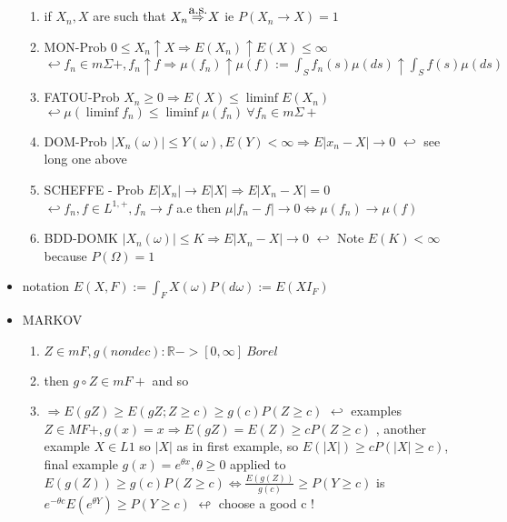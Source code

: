 \documentclass[10pt,landscape,a4paper]{article}
\newcommand\myright[1]{\stackrel{\mathclap{\normalfont\mbox{#1}}}{ \Rightarrow }}
\begin{document}
\begin{multicols*}{3}
\begin{spacing}{0.5}
\begin{itemize}
\begin{enumerate}
\item if $X_n,X$ are such that $X_n \myright{a.s.} X$ ie $P(X_n \rightarrow X)=1$

\item \colorbox{green!10}{MON-Prob $ \boxed{ 0 \le X_n \uparrow X \Rightarrow E(X_n) \uparrow E(X) \le \infty }$ } $ \hookleftarrow {f_n} \in m\Sigma+, f_n \uparrow f \Rightarrow \mu(f_n) \uparrow \mu(f) := \int_S f_n(s) \mu(ds) \uparrow \int_S f(s) \mu(ds) $

\item \colorbox{green!10}{FATOU-Prob $ \boxed { X_n \ge 0 \Rightarrow E(X) \le \liminf E(X_n) }$ } $ \hookleftarrow \mu (\liminf f_n) \le \liminf \mu(f_n) \ \forall f_n \in m\Sigma+$

\item \colorbox{green!10}{DOM-Prob $ \boxed { |X_n(\omega)| \le Y(\omega), E(Y) < \infty \Rightarrow E|x_n-X|\rightarrow 0 }$ } $ \hookleftarrow $ see long one above

\item \colorbox{green!10}{SCHEFFE - Prob $  \boxed{ E |X_n| \rightarrow E|X| \Rightarrow E|X_n-X|=0 }$ } $ \hookleftarrow f_n,f \in L^{1,+}, f_n \rightarrow f$ a.e then $\mu |f_n-f| \rightarrow 0 \Leftrightarrow \mu(f_n) \rightarrow \mu(f) $

\item \colorbox{green!10}{BDD-DOMK $ \boxed{ |X_n(\omega)| \le K \Rightarrow E |X_n-X| \rightarrow 0 }$ } $ \hookleftarrow$ Note $E(K) < \infty$ because $P(\Omega)=1$

\end{enumerate}


\item notation $E(X,F) := \int_F X(\omega) P(d\omega) := E(XI_F)$
\item \colorbox{orange!10}{MARKOV} 

\begin{enumerate}
\item $  Z \in mF, g (nondec): \mathbb{R}->[0,\infty]\ Borel$
\item then $g \circ Z \in mF+$ and so 
\item $\Rightarrow \boxed { E(gZ) \ge E (gZ;Z \ge c) \ge g(c) P(Z \ge c) }$  $ \hookleftarrow$ examples $Z \in MF+, g(x) = x \Rightarrow E(gZ)=E(Z)  \ge c P(Z \ge c)$ , another example $X \in L1$ so $|X|$ as in first example, so $ E(|X|) \ge c P(|X| \ge c) $, final example $g(x)= e^{\theta x}, \theta \ge 0$ applied to $E(g(Z)) \ge g(c) P(Z \ge c) \Leftrightarrow \frac{E(g(Z))}{g(c)} \ge P(Y \ge c) $ is $ e^{-\theta c}E(e^{\theta Y}) \ge P(Y \ge c)$ $\looparrowleft$ choose a good c !
\end{enumerate}


\end{itemize}
\end{spacing}
\end{multicols*}
\end{document}
